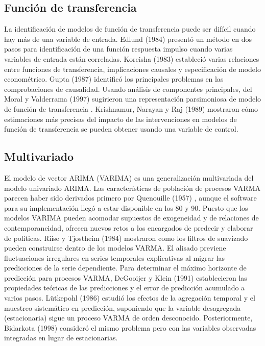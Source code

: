 \documentclass{llncs}
\begin{document}
\subsection{Función de transferencia}
La identificación de modelos de función de transferencia puede ser difícil cuando hay más de una variable de entrada. Edlund (1984) \cite{Edlund1984297} presentó un método en dos pasos para identificación de una función respuesta impulso cuando varias variables de entrada están correladas. Koreisha (1983) \cite{Koreisha1983151} estableció varias relaciones entre funciones de transferencia, implicaciones causales y especificación de modelo econométrico. Gupta (1987) \cite{Gupta1987195} identificó los principales problemas en las comprobaciones de causalidad. Usando análisis de componentes principales, del Moral y Valderrama (1997) \cite{DelMoral1997237} sugirieron una representación parsimoniosa de  modelo de función de transferencia . Krishnamur, Narayan y Raj (1989) \cite{Krishnamurthi198921} mostraron cómo estimaciones más precisas del impacto de las intervenciones en modelos de función de transferencia se pueden obtener usando una variable de control.

\subsection{Multivariado}
El modelo de vector ARIMA (VARIMA) es una generalización multivariada del modelo univariado ARIMA. Las características de población de procesos VARMA parecen haber sido derivados primero por Quenouille (1957) \cite{Quenouille1957}, aunque el software para su implementación llegó a estar disponible en los 80 y 90. Puesto que los modelos VARIMA pueden acomodar supuestos de exogeneidad y de relaciones de contemporaneidad, ofrecen nuevos retos a los encargados de predecir y elaborar de políticas. Riise y Tjostheim (1984) \cite{Riise1984309} mostraron como los filtros de suavizado pueden construirse dentro de los modelos VARMA. El alisado previene fluctuaciones irregulares en series temporales explicativas al migrar las predicciones de la serie dependiente. Para determinar el máximo horizonte de predicción para procesos VARMA, DeGooijer y Klein (1991) \cite{DeGooijer1992135} establecieron las propiedades teóricas de las predicciones y el error de predicción acumulado a varios pasos. Lütkepohl (1986) \cite{Lutkepohl1986461} estudió los efectos de la agregación temporal y el muestreo sistemático en predicción, suponiendo que la variable desagregada (estacionaria) sigue un proceso VARMA de orden desconocido. Posteriormente, Bidarkota (1998) \cite{Bidarkota1998457} consideró el mismo problema pero con las variables observadas integradas en lugar de estacionarias.
\end{document}
